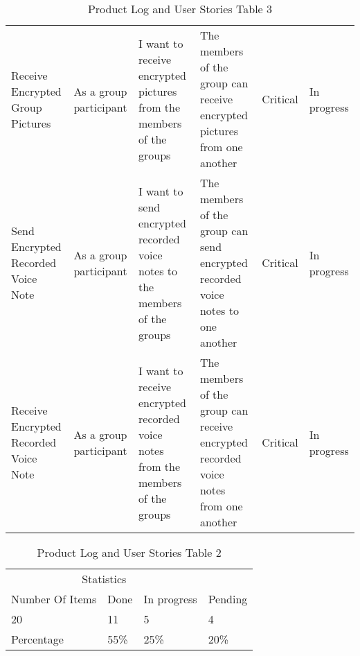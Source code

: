 \documentclass[a4paper]{article}
\begin{document}
\begin{table}
\begin{tabular}{p{2cm} p{2.5cm} p{3cm} p{3cm} p{1cm} p{0.75cm}}
Receive Encrypted Group Pictures & As a group participant & I want to receive encrypted pictures from the members of the groups & The members of the group can receive encrypted pictures from one another & Critical & In progress\\ \cmidrule(l){2-6} %

Send Encrypted Recorded Voice Note & As a group participant & I want to send encrypted recorded voice notes to the members of the groups & The members of the group can send encrypted recorded voice notes to one another & Critical & In progress\\ \cmidrule(l){2-6} %

Receive Encrypted Recorded Voice Note  & As a group participant & I want to receive encrypted recorded voice notes from the members of the groups & The members of the group can receive encrypted recorded voice notes from one another & Critical & In progress\\ %
\midrule %
\midrule %
\end{tabular}
\caption{Product Log and User Stories Table 3} %
\label{tab:template} %
\end{table}


\begin{table} 
\begin{tabular}{p{3cm} p{1.5cm} p{2cm} p{1.5cm}} %
\hline %
\multicolumn{3}{c}{Statistics} \\ %
\cmidrule(l){2-4} %
Number Of Items & Done & In progress & Pending \\  \cmidrule(l){2-4}%

20 & 11 & 5 & 4 \\ %
\midrule %
\midrule %
Percentage & 55\% & 25\% & 20\%\\ %
\bottomrule %
\end{tabular}
\caption{Product Log and User Stories Table 2} %
\label{tab:template} %
\end{table}
\end{document}
